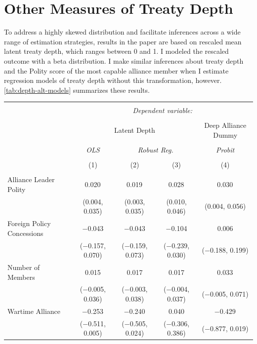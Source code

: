 \documentclass[12pt]{article}
\begin{document}
\section{Other Measures of Treaty Depth}


To address a highly skewed distribution and facilitate inferences across a wide range of estimation strategies, results in the paper are based on rescaled mean latent treaty depth, which ranges between 0 and 1. 
I modeled the rescaled outcome with a beta distribution. 
I make similar inferences about treaty depth and the Polity score of the most capable alliance member when I estimate regression models of treaty depth without this transformation, however. 
\autoref{tab:depth-alt-models} summarizes these results. 

\begin{table}[!htbp] 
\centering 
\begin{adjustbox}{width= .95\textwidth, center}
\begin{tabular}{@{\extracolsep{5pt}}lcccc} 
\\[-1.8ex]\hline 
\hline \\[-1.8ex] 
 & \multicolumn{4}{c}{\textit{Dependent variable:}} \\ 
\cline{2-5} 
\\[-1.8ex] & \multicolumn{3}{c}{Latent Depth} & Deep Alliance Dummy \\ 
\\[-1.8ex] & \textit{OLS} & \multicolumn{2}{c}{\textit{Robust Reg.}} & \textit{Probit} \\ 
\\[-1.8ex] & (1) & (2) & (3) & (4)\\ 
\hline \\[-1.8ex] 
 Alliance Leader Polity & 0.020$^{}$ & 0.019$^{}$ & 0.028$^{}$ & 0.030$^{}$ \\ 
  & (0.004, 0.035) & (0.003, 0.035) & (0.010, 0.046) & (0.004, 0.056) \\ 
  Foreign Policy Concessions & $-$0.043 & $-$0.043 & $-$0.104 & 0.006 \\ 
  & ($-$0.157, 0.070) & ($-$0.159, 0.073) & ($-$0.239, 0.030) & ($-$0.188, 0.199) \\ 
  Number of Members & 0.015 & 0.017 & 0.017 & 0.033$^{}$ \\ 
  & ($-$0.005, 0.036) & ($-$0.003, 0.038) & ($-$0.004, 0.037) & ($-$0.005, 0.071) \\ 
  Wartime Alliance & $-$0.253$^{}$ & $-$0.240$^{}$ & 0.040 & $-$0.429$^{}$ \\ 
  & ($-$0.511, 0.005) & ($-$0.505, 0.024) & ($-$0.306, 0.386) & ($-$0.877, 0.019) \\ 

\end{tabular}
\end{adjustbox}
\end{table}
\end{document}
